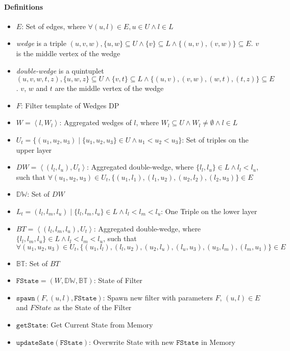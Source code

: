 \documentclass[12pt, a4paper]{article}
\newcommand{\dw}{\mathbb{DW}}
\newcommand{\bt}{\mathbb{BT}}
\newcommand{\st}{\mathtt{FState}}
\newcommand{\sw}{\mathtt{spawn}}
\newcommand{\us}{\mathtt{updateSate}}
\newcommand{\gs}{\mathtt{getState}}
\newcommand{\la}{\left\langle}
\newcommand{\ra}{\right\rangle}
\begin{document}
\paragraph{Definitions}
\begin{itemize}
      \item $E$: Set of edges, where $\forall (u,l) \in E, u \in U \land l \in L$
      \item \textit{wedge} is a triple $(u,v,w), \{u,w\} \subseteq U  \land \{v\} \subseteq L \land \{(u,v), (v,w)\} \subseteq E$. $v$ is the middle vertex of the wedge
      \item \textit{double-wedge} is a quintuplet $(u,v,w,t,z), \{u,w,z\} \subseteq U  \land \{v,t\} \subseteq L \land \{(u,v), (v,w), (w, t), (t,z)\} \subseteq E$. 
            $v$, $w$ and $t$ are the middle vertex of the wedge
      \item $F$: Filter template of Wedges DP
      \item $W = \la l, W_l \ra$: Aggregated wedges of $l$, where $W_l \subseteq U \land W_l \neq \emptyset \land l \in L$
      \item $U_t = \{(u_1, u_2, u_3) \mid \{u_1, u_2, u_3\} \in U \land u_1 < u_2 < u_3\}$: Set of triples on the upper layer
      \item $DW = \la (l_l, l_u), U_t \ra$: Aggregated double-wedge, where $\{l_l, l_u\} \in L \land l_l < l_u$, such that $\forall (u_1, u_2, u_3) \in U_t, \{(u_1, l_1), (l_1, u_2), (u_2, l_2), (l_2, u_3)\} \in E$
      \item $\dw$: Set of $DW$
      \item $L_t = (l_l, l_m, l_u) \mid \{l_l, l_m, l_u\} \in L \land l_l < l_m < l_u$: One Triple on the lower layer
      \item $BT = \la (l_l, l_m, l_u), U_t \ra$: Aggregated double-wedge, where $\{l_l, l_m, l_u\} \in L \land l_l < l_m < l_u$, such that \\
       $\forall (u_1, u_2, u_3) \in U_t, \{(u_1, l_l), (l_l, u_2), (u_2, l_u), (l_u, u_3), (u_3, l_m), (l_m, u_1)\} \in E$
      \item $\bt$: Set of $BT$
      \item $\st = (W, \dw, \bt)$: State of Filter
      \item $\sw(F,(u,l),\st)$: Spawn new filter with parameters $F$, $(u,l) \in E$ and $FState$ as the State of the Filter
      \item $\gs$: Get Current State from Memory
      \item $\us(\st)$: Overwrite State with new $\st$ in Memory

\end{itemize}
\end{document}
